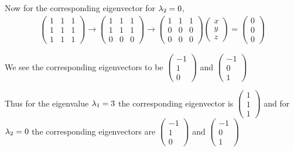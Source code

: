 \documentclass[12pt]{article}
\begin{document}
    Now for the corresponding eigenvector for ${\lambda}_2 = 0 $,
    \begin{align*}
        \begin{pmatrix}
            1& 1 & 1 \\
            1 & 1 & 1 \\
            1 & 1 & 1
        \end{pmatrix} \rightarrow \begin{pmatrix}
            1 & 1 & 1 \\ 1 & 1 & 1 \\ 0 & 0 & 0 
        \end{pmatrix} \rightarrow \begin{pmatrix}
            1 & 1 & 1 \\ 0 & 0 & 0 \\ 0 & 0 & 0
        \end{pmatrix} \begin{pmatrix}
            x \\ y \\ z
        \end{pmatrix}= \begin{pmatrix}
            0 \\ 0 \\ 0
        \end{pmatrix}
    \end{align*}

    We see the corresponding eigenvectors to be $\begin{pmatrix}
        -1 \\ 1 \\0
    \end{pmatrix}$ and $\begin{pmatrix}
        -1 \\ 0 \\1
    \end{pmatrix}$

    Thus for the eigenvalue ${\lambda}_1 = 3$ the corresponding eigenvector is $\begin{pmatrix}
        1 \\ 1 \\ 1
    \end{pmatrix}$ and for ${\lambda}_2 = 0$ the corresponding eigenvectors are $\begin{pmatrix}
        -1 \\ 1 \\0
    \end{pmatrix}$ and $\begin{pmatrix}
        -1 \\ 0 \\1
    \end{pmatrix}$
\end{document}
